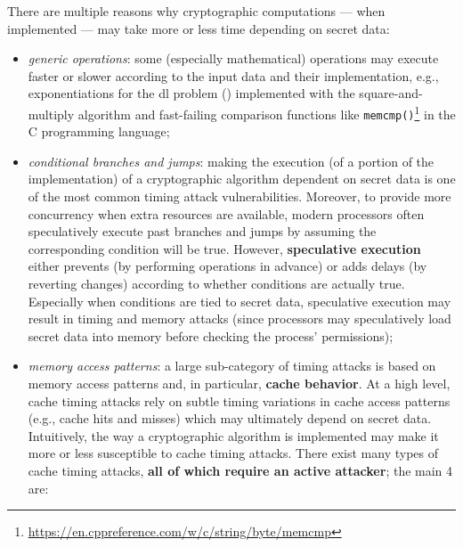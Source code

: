 
There are multiple reasons why cryptographic computations --- when implemented --- may take more or less time depending on secret data:

\begin{itemize}
	\item \textit{generic operations}: some (especially mathematical) operations may execute faster or slower according to the input data and their implementation, e.g., exponentiations for the \gls{dl} problem () implemented with the square-and-multiply algorithm and fast-failing comparison functions like \texttt{memcmp()}\footnote{\url{https://en.cppreference.com/w/c/string/byte/memcmp}} in the C programming language;
	
	\item \textit{conditional branches and jumps}: making the execution (of a portion of the implementation) of a cryptographic algorithm dependent on secret data is one of the most common timing attack vulnerabilities. Moreover, to provide more concurrency when extra resources are available, modern processors often speculatively execute past branches and jumps by assuming the corresponding condition will be true. However, \textbf{speculative execution} either prevents (by performing operations in advance) or adds delays (by reverting changes) according to whether conditions are actually true. Especially when conditions are tied to secret data, speculative execution may result in timing and memory attacks (since processors may speculatively load secret data into memory before checking the process' permissions);
	
	
	\item \textit{memory access patterns}: a large sub-category of timing attacks is based on memory access patterns and, in particular, \textbf{cache behavior}. At a high level, cache timing attacks rely on subtle timing variations in cache access patterns (e.g., cache hits and misses) which may ultimately depend on secret data. Intuitively, the way a cryptographic algorithm is implemented may make it more or less susceptible to cache timing attacks. 
	There exist many types of cache timing attacks, \textbf{all of which require an active attacker}; the main 4 are:
	

\end{itemize}
